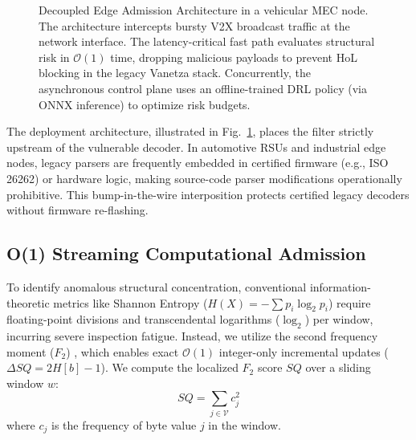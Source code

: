 \documentclass[conference]{IEEEtran}
\begin{document}
\begin{figure}[!ht]
{%
}
\caption{Decoupled Edge Admission Architecture in a vehicular MEC node. The architecture intercepts bursty V2X broadcast traffic at the network interface. The latency-critical fast path evaluates structural risk in $\mathcal{O}(1)$ time, dropping malicious payloads to prevent HoL blocking in the legacy Vanetza stack. Concurrently, the asynchronous control plane uses an offline-trained DRL policy (via ONNX inference) to optimize risk budgets.}
\label{fig:architecture}
\end{figure}

The deployment architecture, illustrated in Fig.~\ref{fig:architecture}, places the filter strictly upstream of the vulnerable decoder. In automotive RSUs and industrial edge nodes, legacy parsers are frequently embedded in certified firmware (e.g., ISO 26262) or hardware logic, making source-code parser modifications operationally prohibitive. This bump-in-the-wire interposition protects certified legacy decoders without firmware re-flashing.

\subsection{O(1) Streaming Computational Admission}
To identify anomalous structural concentration, conventional information-theoretic metrics like Shannon Entropy ($H(X) = -\sum p_i \log_2 p_i$) require floating-point divisions and transcendental logarithms ($\log_2$) per window, incurring severe inspection fatigue. Instead, we utilize the second frequency moment ($F_2$) \cite{Alon1996}, which enables exact $\mathcal{O}(1)$ integer-only incremental updates ($\Delta SQ = 2H[b] - 1$). We compute the localized $F_2$ score $SQ$ over a sliding window $w$:
$$SQ = \sum_{j \in \mathcal{V}} c_j^2$$
where $c_j$ is the frequency of byte value $j$ in the window. 
\end{document}
